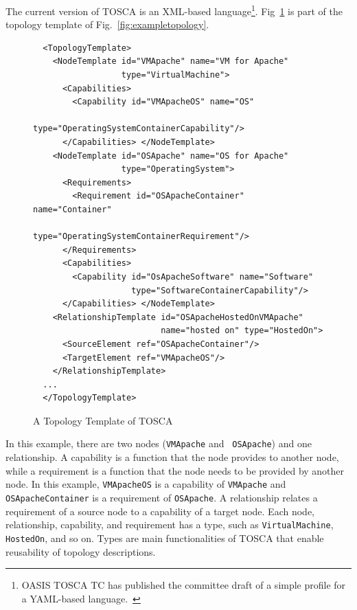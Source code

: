 \documentclass[12pt]{report}
\begin{document}
The current version of TOSCA is an XML-based language\footnote{OASIS
  TOSCA TC has published the committee draft of a simple profile for a
  YAML-based language.~\cite{TOSCAYAML}}. Fig~\ref{fig:topology} is 
part of the topology template of Fig.~\ref{fig:exampletopology}.
\begin{figure}
\small
\begin{verbatim}
  <TopologyTemplate>
    <NodeTemplate id="VMApache" name="VM for Apache" 
                  type="VirtualMachine">
      <Capabilities>
        <Capability id="VMApacheOS" name="OS" 
                    type="OperatingSystemContainerCapability"/>
      </Capabilities> </NodeTemplate>
    <NodeTemplate id="OSApache" name="OS for Apache" 
                  type="OperatingSystem">
      <Requirements>
        <Requirement id="OSApacheContainer" name="Container" 
                     type="OperatingSystemContainerRequirement"/>
      </Requirements>
      <Capabilities>
        <Capability id="OsApacheSoftware" name="Software" 
                    type="SoftwareContainerCapability"/>
      </Capabilities> </NodeTemplate>
    <RelationshipTemplate id="OSApacheHostedOnVMApache"
                          name="hosted on" type="HostedOn">
      <SourceElement ref="OSApacheContainer"/>
      <TargetElement ref="VMApacheOS"/>
    </RelationshipTemplate>
  ...
  </TopologyTemplate>
\end{verbatim}
\normalsize
\caption{A Topology Template of TOSCA}
\label{fig:topology}
\end{figure}
In this example, there are two nodes ({\tt VMApache} and {\tt
  OSApache}) and one relationship.  A capability is a function that
the node provides to another node, while a requirement is a function
that the node needs to be provided by another node. In this example,
{\tt VMApacheOS} is a capability of {\tt VMApache} and {\tt
  OSApacheContainer} is a requirement of {\tt OSApache}.  A
relationship relates a requirement of a source node to a capability of
a target node.  Each node, relationship, capability, and requirement
has a type, such as {\tt VirtualMachine}, {\tt HostedOn}, and so
on. Types are main functionalities of TOSCA that enable reusability of
topology descriptions.
\end{document}
